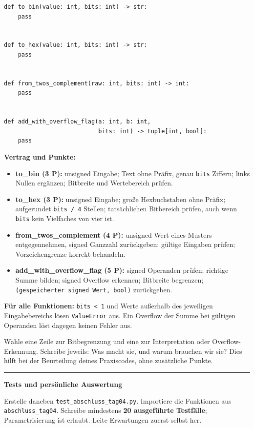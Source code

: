 \documentclass[10pt,a4paper]{article}
\newcommand{\titlepagepart}[2]{\vspace*{-4mm}{\sffamily\small #1}\par{\sffamily\LARGE\bfseries #2}\par\vspace{2mm}}
\newcommand{\block}[1]{\par\vspace{2mm}{\sffamily\large\bfseries #1}\par}
\newcommand{\code}[1]{\texttt{#1}}
\newcommand{\antwort}[1]{\par\vspace{#1}\hrule\vspace{2mm}}
\newcommand{\aufgabe}[2]{\block{#1 \hfill #2 Punkte}}
\begin{document}
\begin{lstlisting}
def to_bin(value: int, bits: int) -> str:
    pass


def to_hex(value: int, bits: int) -> str:
    pass


def from_twos_complement(raw: int, bits: int) -> int:
    pass


def add_with_overflow_flag(a: int, b: int,
                           bits: int) -> tuple[int, bool]:
    pass
\end{lstlisting}
\textbf{Vertrag und Punkte:}
\begin{itemize}
\item \textbf{to\_bin (3 P):} unsigned Eingabe; Text ohne Präfix, genau
\code{bits} Ziffern; links Nullen ergänzen; Bitbreite und Wertebereich prüfen.
\item \textbf{to\_hex (3 P):} unsigned Eingabe; große Hexbuchstaben ohne Präfix;
aufgerundet \code{bits / 4} Stellen; tatsächlichen Bitbereich prüfen, auch wenn
\code{bits} kein Vielfaches von vier ist.
\item \textbf{from\_twos\_complement (4 P):} unsigned Wert eines Musters
entgegennehmen, signed Ganzzahl zurückgeben; gültige Eingaben prüfen;
Vorzeichengrenze korrekt behandeln.
\item \textbf{add\_with\_overflow\_flag (5 P):} signed Operanden prüfen;
richtige Summe bilden; signed Overflow erkennen; Bitbreite begrenzen;
\code{(gespeicherter signed Wert, bool)} zurückgeben.
\end{itemize}
\textbf{Für alle Funktionen:} \code{bits < 1} und Werte außerhalb des jeweiligen
Eingabebereichs lösen \code{ValueError} aus. Ein Overflow der Summe bei gültigen
Operanden löst dagegen keinen Fehler aus.

\block{Erkläre zwei deiner eigenen Codezeilen}
Wähle eine Zeile zur Bitbegrenzung und eine zur Interpretation oder
Overflow-Erkennung. Schreibe jeweils: Was macht sie, und warum brauchen wir sie?
Dies hilft bei der Beurteilung deines Praxiscodes, ohne zusätzliche Punkte.
\antwort{35mm}

\newpage
\titlepagepart{06 / VERIFIKATION}{Tests und persönliche Auswertung}
\aufgabe{7. Beweise, dass dein Code funktioniert}{10}
Erstelle daneben \code{test\_abschluss\_tag04.py}. Importiere die Funktionen aus
\code{abschluss\_tag04}. Schreibe mindestens \textbf{20 ausgeführte Testfälle};
Parametrisierung ist erlaubt. Leite Erwartungen zuerst selbst her.
\end{document}
